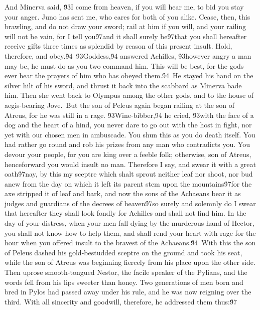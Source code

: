 {And Minerva said, \'93I come from heaven, if you will hear me, to bid you stay your anger. Juno has sent me, who cares for both of you alike. Cease, then, this brawling, and do not draw your sword; rail at him if you will, and your railing will not be vain, for I tell you\'97and it shall surely be\'97that you shall hereafter receive gifts three times as splendid by reason of this present insult. Hold, therefore, and obey.\'94\
\'93Goddess,\'94 answered Achilles, \'93however angry a man may be, he must do as you two command him. This will be best, for the gods ever hear the prayers of him who has obeyed them.\'94\
He stayed his hand on the silver hilt of his sword, and thrust it back into the scabbard as Minerva bade him. Then she went back to Olympus among the other gods, and to the house of aegis-bearing Jove.\
But the son of Peleus again began railing at the son of Atreus, for he was still in a rage. \'93Wine-bibber,\'94 he cried, \'93with the face of a dog and the heart of a hind, you never dare to go out with the host in fight, nor yet with our chosen men in ambuscade. You shun this as you do death itself. You had rather go round and rob his prizes from any man who contradicts you. You devour your people, for you are king over a feeble folk; otherwise, son of Atreus, henceforward you would insult no man. Therefore I say, and swear it with a great oath\'97nay, by this my sceptre which shalt sprout neither leaf nor shoot, nor bud anew from the day on which it left its parent stem upon the mountains\'97for the axe stripped it of leaf and bark, and now the sons of the Achaeans bear it as judges and guardians of the decrees of heaven\'97so surely and solemnly do I swear that hereafter they shall look fondly for Achilles and shall not find him. In the day of your distress, when your men fall dying by the murderous hand of Hector, you shall not know how to help them, and shall rend your heart with rage for the hour when you offered insult to the bravest of the Achaeans.\'94\
With this the son of Peleus dashed his gold-bestudded sceptre on the ground and took his seat, while the son of Atreus was beginning fiercely from his place upon the other side. Then uprose smooth-tongued Nestor, the facile speaker of the Pylians, and the words fell from his lips sweeter than honey. Two generations of men born and bred in Pylos had passed away under his rule, and he was now reigning over the third. With all sincerity and goodwill, therefore, he addressed them thus:\'97\
}

